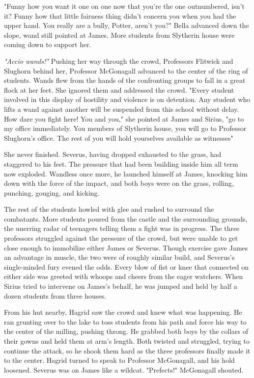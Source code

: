 "Funny how you want it one on one now that you're the one outnumbered, isn't it? Funny how that little fairness thing didn't concern you when you had the upper hand. You really are a bully, Potter, aren't you?" Bella advanced down the slope, wand still pointed at James. More students from Slytherin house were coming down to support her.

\emph{"Accio wands!"} Pushing her way through the crowd, Professors Flitwick and Slughorn behind her, Professor McGonagall advanced to the center of the ring of students. Wands flew from the hands of the confronting groups to fall in a great flock at her feet. She ignored them and addressed the crowd. "Every student involved in this display of hostility and violence is on detention. Any student who lifts a wand against another will be suspended from this school without delay. How dare you fight here! You and you," she pointed at James and Sirius, "go to my office immediately. You members of Slytherin house, you will go to Professor Slughorn's office. The rest of you will hold yourselves available as witnesses{\el}"

She never finished. Severus, having dropped exhausted to the grass, had staggered to his feet. The pressure that had been building inside him all term now exploded. Wandless once more, he launched himself at James, knocking him down with the force of the impact, and both boys were on the grass, rolling, punching, gouging, and kicking.

The rest of the students howled with glee and rushed to surround the combatants. More students poured from the castle and the surrounding grounds, the unerring radar of teenagers telling them a fight was in progress. The three professors struggled against the pressure of the crowd, but were unable to get close enough to immobilize either James or Severus. Though exercise gave James an advantage in muscle, the two were of roughly similar build, and Severus's single-minded fury evened the odds. Every blow of fist or knee that connected on either side was greeted with whoops and cheers from the eager watchers. When Sirius tried to intervene on James's behalf, he was jumped and held by half a dozen students from three houses.

From his hut nearby, Hagrid saw the crowd and knew what was happening. He ran grunting over to the lake to toss students from his path and force his way to the center of the milling, pushing throng. He grabbed both boys by the collars of their gowns and held them at arm's length. Both twisted and struggled, trying to continue the attack, so he shook them hard as the three professors finally made it to the center. Hagrid turned to speak to Professor McGonagall, and his hold loosened. Severus was on James like a wildcat. "Prefects!" McGonagall shouted.

